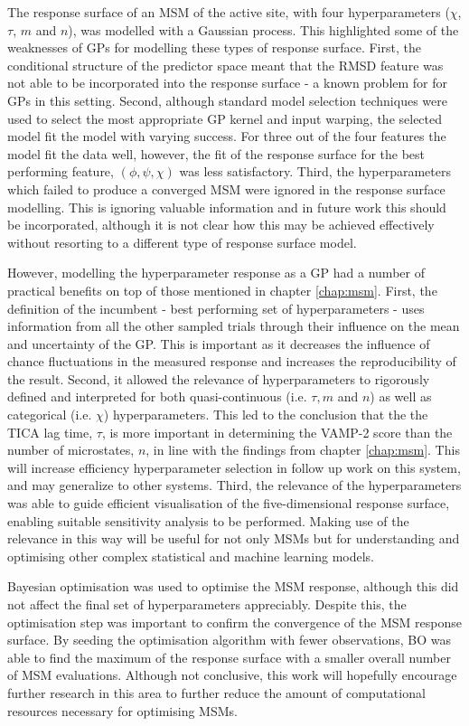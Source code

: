 The response surface of an MSM of the active site, with four hyperparameters ($\chi$, $\tau$, $m$ and $n$), was modelled with a Gaussian process. This highlighted some of the weaknesses of GPs for modelling these types of response surface. First, the conditional structure of the predictor space meant that the RMSD feature was not able to be incorporated into the response surface - a known problem for for GPs in this setting. Second, although standard model selection techniques were used to select the most appropriate GP kernel and input warping, the selected model fit the model with varying success. For three out of the four features the model fit the data well, however, the fit of the response surface for the best performing feature, $(\phi, \psi, \chi)$  was less satisfactory. Third, the hyperparameters which failed to produce a converged MSM were ignored in the response surface modelling. This is ignoring valuable information and in future work this should be incorporated, although it is not clear how this may be achieved effectively without resorting to a different type of response surface model.  

However, modelling the hyperparameter response as a GP had a number of practical benefits on top of those mentioned in chapter \ref{chap:msm}. First, the definition of the incumbent -  best performing set of hyperparameters - uses information from all the other sampled trials through their influence on the mean and uncertainty of the GP. This is important as it decreases the influence of chance fluctuations in the measured response and increases the reproducibility of the result. Second, it allowed the relevance of hyperparameters to rigorously defined and interpreted for both quasi-continuous (i.e. $\tau, m$ and $n$) as well as categorical (i.e. $\chi$) hyperparameters. This led to the conclusion that the the TICA lag time, $\tau$, is more important in determining the VAMP-2 score than the number of microstates, $n$, in line with the findings from chapter \ref{chap:msm}. This will increase efficiency hyperparameter selection in follow up work on this system, and may generalize to other systems.  Third, the relevance of the hyperparameters was able to guide efficient visualisation of the five-dimensional response surface, enabling suitable sensitivity analysis to be performed. Making use of the relevance in this way will be useful for not only MSMs but for understanding and optimising other complex statistical and machine learning models.  

Bayesian optimisation was used to optimise the MSM response, although this did not affect the final set of hyperparameters appreciably. Despite this, the optimisation step was important to confirm the convergence of the MSM response surface. By seeding the optimisation algorithm with fewer observations, BO was able to find the maximum of the response surface with a smaller overall number of MSM evaluations. Although not conclusive, this work will hopefully encourage further research in this area to further reduce the amount of computational resources necessary for optimising MSMs. 

